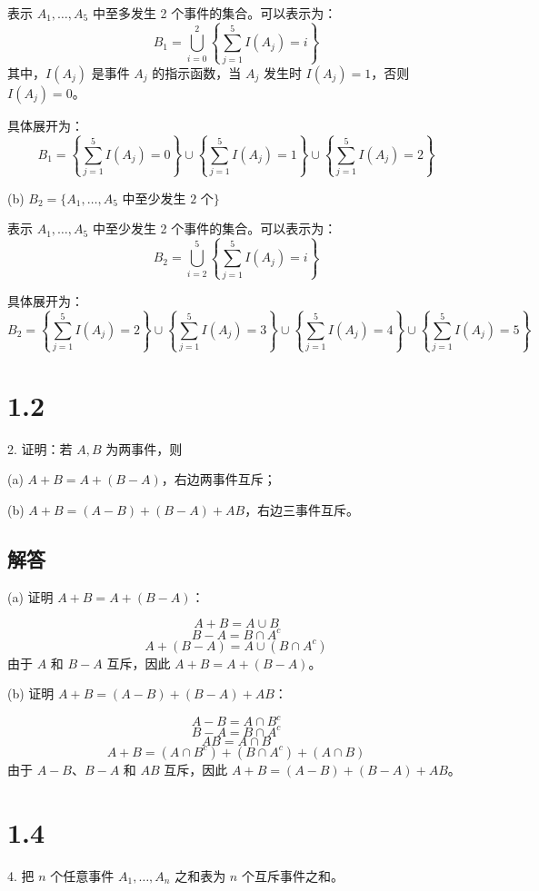 \documentclass[UTF8]{report}
\theoremstyle{MyLineTheoremStyle} %
\theoremstyle{MyBlockTheoremStyle} %
\theoremstyle{MySubsubsectionStyle} %
\begin{document}
表示 \(A_1, \ldots, A_5\) 中至多发生 2 个事件的集合。可以表示为：
\[
B_1 = \bigcup_{i=0}^{2} \left\{ \sum_{j=1}^{5} I(A_j) = i \right\}
\]
其中，\(I(A_j)\) 是事件 \(A_j\) 的指示函数，当 \(A_j\) 发生时 \(I(A_j) = 1\)，否则 \(I(A_j) = 0\)。

具体展开为：
\[
B_1 = \left\{ \sum_{j=1}^{5} I(A_j) = 0 \right\} \cup \left\{ \sum_{j=1}^{5} I(A_j) = 1 \right\} \cup \left\{ \sum_{j=1}^{5} I(A_j) = 2 \right\}
\]

(b) \(B_2 = \{A_1, \ldots, A_5 \text{ 中至少发生 2 个}\}\)

表示 \(A_1, \ldots, A_5\) 中至少发生 2 个事件的集合。可以表示为：
\[
B_2 = \bigcup_{i=2}^{5} \left\{ \sum_{j=1}^{5} I(A_j) = i \right\}
\]

具体展开为：
\[
B_2 = \left\{ \sum_{j=1}^{5} I(A_j) = 2 \right\} \cup \left\{ \sum_{j=1}^{5} I(A_j) = 3 \right\} \cup \left\{ \sum_{j=1}^{5} I(A_j) = 4 \right\} \cup \left\{ \sum_{j=1}^{5} I(A_j) = 5 \right\}
\]

\section{1.2}

2. 证明：若 \(A, B\) 为两事件，则\par
(a) \(A + B = A + (B - A)\)，右边两事件互斥；\par
(b) \(A + B = (A - B) + (B - A) + AB\)，右边三事件互斥。

\subsection*{解答}

(a) 证明 \(A + B = A + (B - A)\)：

\[
A + B = A \cup B
\]
\[
B - A = B \cap A^c
\]
\[
A + (B - A) = A \cup (B \cap A^c)
\]
由于 \(A\) 和 \(B - A\) 互斥，因此 \(A + B = A + (B - A)\)。

(b) 证明 \(A + B = (A - B) + (B - A) + AB\)：

\[
A - B = A \cap B^c
\]
\[
B - A = B \cap A^c
\]
\[
AB = A \cap B
\]
\[
A + B = (A \cap B^c) + (B \cap A^c) + (A \cap B)
\]
由于 \(A - B\)、\(B - A\) 和 \(AB\) 互斥，因此 \(A + B = (A - B) + (B - A) + AB\)。

\section{1.4}

4. 把 \(n\) 个任意事件 \(A_1, \ldots, A_n\) 之和表为 \(n\) 个互斥事件之和。
\end{document}
